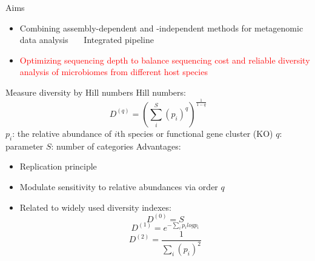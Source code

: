 \documentclass{beamer}
\begin{document}
\begin{frame}{Aims}
    \begin{itemize}
        \item Combining assembly-dependent and -independent methods for metagenomic data analysis
        \newline \ \ \ Integrated pipeline
        \item \textcolor{red}{Optimizing sequencing depth to balance sequencing cost and reliable diversity analysis of microbiomes from different host species}
    \end{itemize}
\end{frame}

\begin{frame}{Measure diversity by Hill numbers}
    Hill numbers:
    \begin{equation}
        D^{(q)} = (\sum_{i}^{S}(p_i)^q)^{\frac{1}{1-q}}
        \label{HillNumbers}
      \end{equation}
      $p_i$: the relative abundance of $i$th species or functional gene cluster (KO)
      \newline
      $q$: parameter
      \newline
      $S$: number of categories
      \newline
      \newline
      Advantages:
      \begin{itemize}
          \item Replication principle
          \item Modulate sensitivity to relative abundances via order $q$
          \item Related to widely used diversity indexes:
          \begin{equation}
            D^{(0)} = S
            \end{equation}
            \begin{equation}
                D^{(1)} = e^{-\sum_{i}p_ilogp_i}
            \end{equation}
            \begin{equation}
                D^{(2)} = \frac{1}{\sum_{i}(p_i)^2}
            \end{equation}
      \end{itemize}
\end{frame}
\end{document}
